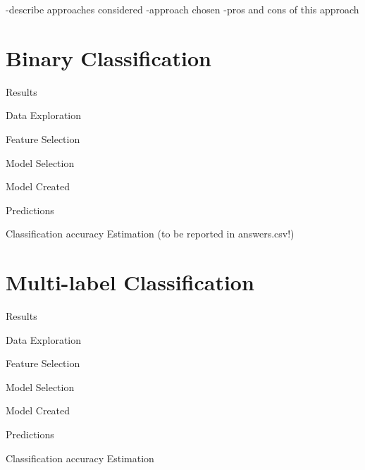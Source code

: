 \documentclass[a4size, 12pt]{report}
\begin{document}
	-describe approaches considered
	-approach chosen
	-pros and cons of this approach
	
	\chapter{Binary Classification}
	
		Results
	
	Data Exploration
	
	Feature Selection
	
	Model Selection
	
	Model Created
	
	Predictions
	
	Classification accuracy Estimation (to be reported in answers.csv!)
	
	
	\chapter{Multi-label Classification}
	
	
	Results
	
	Data Exploration
	
	Feature Selection
	
	Model Selection
	
	Model Created
	
	Predictions
	
	Classification accuracy Estimation
	
	
	     
\end{document}
